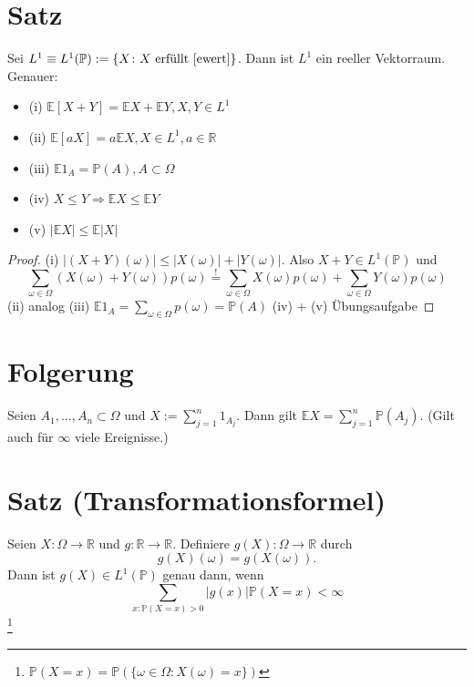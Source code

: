 \documentclass[a4paper,11pt,notitlepage]{report}
\newcommand{\R}{{\ensuremath{\mathbb{R}}}}
\newcommand{\Prim}{{\ensuremath{\mathbb{P}}}}
\newcommand{\E}{{\ensuremath{\mathbb{E}}}}
\begin{document}
\section{Satz}
Sei $L^1 \equiv L^1(\Prim) := \{X \colon X \text{ erfüllt } \ref{ewert} \}$. Dann ist $L^1$ ein reeller Vektorraum. Genauer:
\begin{itemize}
	\item (i) $\E [X+Y] = \E X + \E Y, X,Y \in L^1$
	\item (ii) $\E [aX] = a \E X, X \in L^1, a \in \R$
	\item (iii) $\E 1_A = \Prim(A), A \subset \Omega$
	\item (iv) $X \leq Y \Rightarrow \E X \leq \E Y$
	\item (v) $|\E X| \leq \E |X|$
\end{itemize}

\begin{proof}
	(i) $|(X+Y)(\omega)| \leq |X(\omega)| + |Y(\omega)|$.
	\newline
	Also $X+Y \in L^1(\Prim)$ und
	$$\sum\limits_{\omega \in \Omega}{(X(\omega)+Y(\omega)) p(\omega)} \overset{!}{=} \sum\limits_{\omega \in \Omega}{X(\omega)p(\omega)} + \sum\limits_{\omega \in \Omega}{Y(\omega)p(\omega)}$$
	(ii) analog
	\newline
	(iii) $\E 1_A = \sum\limits_{\omega \in \Omega}{p(\omega)}=\Prim(A)$
	\newline
	(iv) + (v) Übungsaufgabe
\end{proof}

\section{Folgerung}
\label{folg}
Seien $A_1, \ldots, A_n \subset \Omega$ und $X := \sum\limits_{j=1}^{n}{1_{A_j}}$. Dann gilt $\E X = \sum\limits_{j=1}^{n}{\Prim(A_j)}$. \newline
(Gilt auch für $\infty$ viele Ereignisse.)

\section{Satz (Transformationsformel)}
\label{5.4}
Seien $X \colon \Omega \rightarrow \R$ und $g \colon \R \rightarrow \R$. Definiere $g(X) \colon \Omega \rightarrow \R$ durch $$g(X)(\omega) = g(X(\omega)).$$ Dann ist $g(X) \in L^1(\Prim)$ genau dann, wenn
$$\sum\limits_{x \colon \Prim(X=x)>0}{|g(x)| \Prim(X=x)} < \infty$$\footnote{$\Prim(X=x) = \Prim(\{\omega \in \Omega \colon X(\omega)=x\})$}
\end{document}
